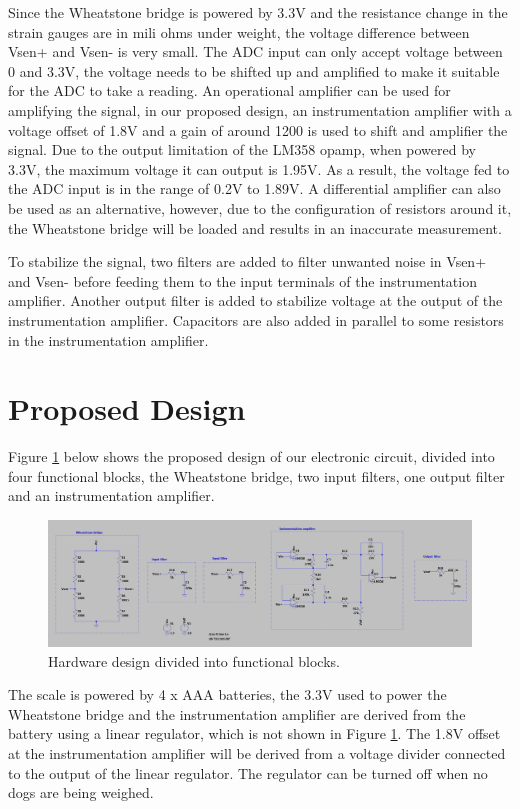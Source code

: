 Since the Wheatstone bridge is powered by 3.3V and the resistance change in the strain gauges are in mili ohms under weight, the voltage difference between Vsen+ and Vsen- is very small. The ADC input can only accept voltage between 0 and 3.3V, the voltage needs to be shifted up and amplified to make it suitable for the ADC to take a reading. An operational amplifier can be used for amplifying the signal, in our proposed design, an instrumentation amplifier with a voltage offset of 1.8V and a gain of around 1200 is used to shift and amplifier the signal. Due to the output limitation of the LM358 opamp, when powered by 3.3V, the maximum voltage it can output is 1.95V. As a result, the voltage fed to the ADC input is in the range of 0.2V to 1.89V. A differential amplifier can also be used as an alternative, however, due to the configuration of resistors around it, the Wheatstone bridge will be loaded and results in an inaccurate measurement.

To stabilize the signal, two filters are added to filter unwanted noise in Vsen+ and Vsen- before feeding them to the input terminals of the instrumentation amplifier. Another output filter is added to stabilize voltage at the output of the instrumentation amplifier. Capacitors are also added in parallel to some resistors in the instrumentation amplifier.

\section{Proposed Design}
Figure \ref{fig:hardware} below shows the proposed design of our electronic circuit, divided into four functional blocks, the Wheatstone bridge, two input filters, one output filter and an instrumentation amplifier.

\begin{figure}[h]
    \centering
    \includegraphics[width=\textwidth]{proposal/parts/hardware-circuit.png}
    \caption{Hardware design divided into functional blocks.}
    \label{fig:hardware}
\end{figure}

The scale is powered by 4 x AAA batteries, the 3.3V used to power the Wheatstone bridge and the instrumentation amplifier are derived from the battery using a linear regulator, which is not shown in Figure \ref{fig:hardware}. The 1.8V offset at the instrumentation amplifier will be derived from a voltage divider connected to the output of the linear regulator. The regulator can be turned off when no dogs are being weighed.

